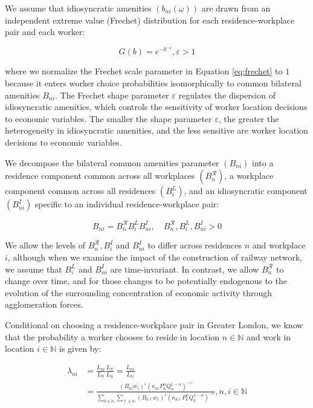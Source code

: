 We assume that idiosyncratic amenities $(b_{ni}(\omega))$ are drawn from an independent extreme value (Frechet) distribution for each residence-workplace pair and each worker:

\begin{equation}
    G(b) = e^{-b^{-\varepsilon}}, \varepsilon > 1 \label{eq:frechet}
\end{equation}

where we normalize the Frechet scale parameter in Equation \eqref{eq:frechet} to $1$ because it enters worker choice probabilities isomorphically to common bilateral amenities $B_{ni}$. The Frechet shape parameter $\varepsilon$ regulates the dispersion of idiosyncratic amenities, which controls the sensitivity of worker location decisions to economic variables. The smaller the shape parameter $\varepsilon$, the greater the heterogeneity in idiosyncratic amenities, and the less sensitive are worker location decisions to economic variables.

We decompose the bilateral common amenities parameter $(B_{ni})$ into a residence component common across all workplaces $(B_n^{\mathcal{R}})$, a workplace component common across all residences $(B_i^L)$, and an idiosyncratic component $(B_{ni}^I)$ specific to an individual residence-workplace pair:

\begin{equation}
    B_{ni} = B_n^{\mathcal{R}}B_i^L B_{ni}^I, \quad B_n^{\mathcal{R}}, B_i^L, B_{ni}^I > 0
\end{equation}

We allow the levels of $B_n^{\mathcal{R}}, B_i^I$ and $B_{ni}^I$ to differ across residences $n$ and workplace $i$, although when we examine the impact of the construction of railway network, we assume that $B_i^L$ and $B_{ni}^I$ are time-invariant. In contrast, we allow $B_n^{\mathcal{R}}$ to change over time, and for those changes to be potentially endogenous to the evolution of the surrounding concentration of economic activity through agglomeration forces.

Conditional on choosing a residence-workplace pair in Greater London, we know that the probability a worker chooses to reside in location $n \in \mathbb{N}$ and work in location $i \in \mathbb{N}$ is given by:

\begin{equation}
    \begin{aligned}
        \lambda_{ni} & = \frac{L_{ni}}{L_{\mathbb{M}}} \frac{L_{\mathbb{M}}}{L_{\mathbb{N}}} = \frac{L_{ni}}{L_{\mathbb{N}}} \\
        & = \frac{(B_{ni} w_i)^{\varepsilon} (\kappa_{ni} P_n^{\alpha} Q_n^{1 - \alpha})^{-\varepsilon}}{\sum_{k \in \mathbb{N}} \sum_{\ell \in \mathbb{N}} (B_{k\ell}w_{\ell})^{\varepsilon} (\kappa_{k\ell} P_{k}^{\alpha} Q_k^{1 - \alpha})^{-\varepsilon} }, n,  i \in \mathbb{N}
    \end{aligned}
\end{equation}

